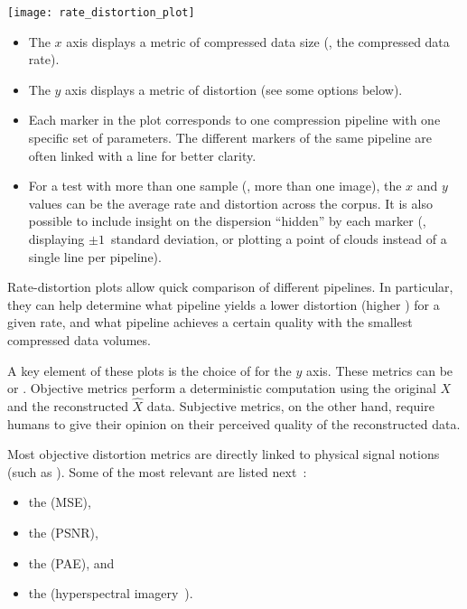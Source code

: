 \begin{center}
    \texttt{[image: rate\_distortion\_plot]}
\end{center}

\begin{itemize}
\item The $x$ axis displays a metric of compressed data size (\eg, the compressed data rate).
\item The $y$ axis displays a metric of distortion (see some options below).
\item Each marker in the plot corresponds to one compression pipeline with one specific set of parameters.
    The different markers of the same pipeline are often linked with a line for better clarity.
\item For a test  with more than one sample (\eg, more than one image),
    the $x$ and $y$ values can be the average rate and distortion across the corpus.
    It is also possible to include insight on the dispersion ``hidden'' by each marker
    (\eg, displaying $\pm 1$~standard deviation, or plotting a point of clouds instead of a single
    line per pipeline).
\end{itemize}

Rate-distortion plots allow quick comparison of different pipelines. In particular,
they can help determine what pipeline yields a lower distortion (higher )
for a given rate, and what pipeline achieves a certain quality with the smallest compressed
data volumes.

A key element of these plots is the choice of  for the $y$ axis.
These metrics can be 
or .
Objective metrics perform a deterministic computation using the original $X$ and
the reconstructed $\hat{X}$ data. Subjective metrics, on the other hand, require
humans to give their opinion on their perceived quality of the reconstructed data.

Most objective distortion metrics are directly linked to
physical signal notions (such as ). Some of the most relevant
are listed next~\cite[\S 8.1]{sayood_introduction}:
\begin{itemize}
    \item the  (MSE),
    \item the  (PSNR),
    \item the  (PAE), and
    \item the  (hyperspectral imagery~\cite[``The Spectral Angle Mapper (SAM)'']{kruse_spectral_angle}).
\end{itemize}

